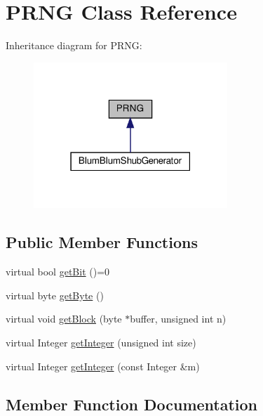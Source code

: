 \hypertarget{classPRNG}{}\section{P\+R\+NG Class Reference}
\label{classPRNG}


Inheritance diagram for P\+R\+NG\+:
\nopagebreak
\begin{figure}[H]
\begin{center}
\leavevmode
\includegraphics[width=207pt]{classPRNG__inherit__graph}
\end{center}
\end{figure}
\subsection*{Public Member Functions}
\begin{DoxyCompactItemize}
\item 
virtual bool \hyperlink{classPRNG_a513ec082275e805da358a2a790db2f9e}{get\+Bit} ()=0
\item 
virtual byte \hyperlink{classPRNG_aaef8a8a16c7a871a85262e26a19b9048}{get\+Byte} ()
\item 
virtual void \hyperlink{classPRNG_a1b48ca02baade80760485574d2a84644}{get\+Block} (byte $\ast$buffer, unsigned int n)
\item 
virtual Integer \hyperlink{classPRNG_aee67ebb332e0336b2dceefb6bba726db}{get\+Integer} (unsigned int size)
\item 
virtual Integer \hyperlink{classPRNG_af9eb9406a3ba8308447a125c1f24d7df}{get\+Integer} (const Integer \&m)
\end{DoxyCompactItemize}


\subsection{Member Function Documentation}
\mbox{\label{classPRNG_a513ec082275e805da358a2a790db2f9e}} 
